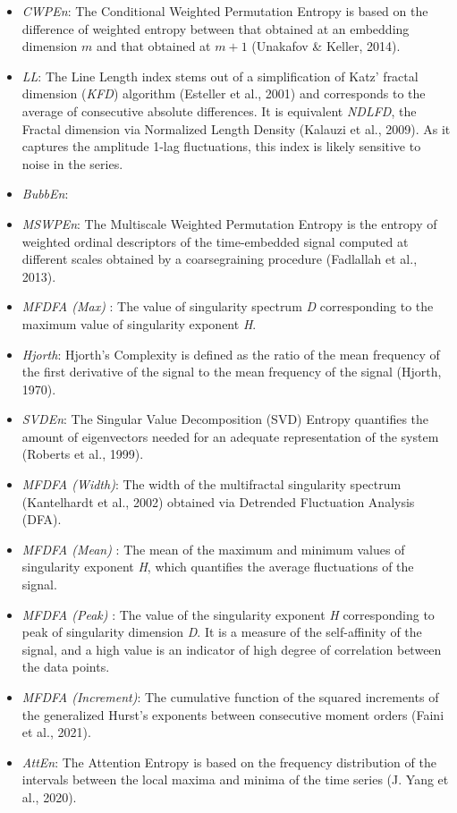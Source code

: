 \documentclass[
  man]{apa6}
\providecommand{\tightlist}{%
  \setlength{\itemsep}{0pt}\setlength{\parskip}{0pt}}
\begin{document}
\begin{itemize}
\tightlist
\item
  \emph{CWPEn}: The Conditional Weighted Permutation Entropy is based on the difference of weighted entropy between that obtained at an embedding dimension \(m\) and that obtained at \(m+1\) (Unakafov \& Keller, 2014).
\item
  \emph{LL}: The Line Length index stems out of a simplification of Katz' fractal dimension (\emph{KFD}) algorithm (Esteller et al., 2001) and corresponds to the average of consecutive absolute differences. It is equivalent \emph{NDLFD}, the Fractal dimension via Normalized Length Density (Kalauzi et al., 2009). As it captures the amplitude 1-lag fluctuations, this index is likely sensitive to noise in the series.
\item
  \emph{BubbEn}:
\item
  \emph{MSWPEn}: The Multiscale Weighted Permutation Entropy is the entropy of weighted ordinal descriptors of the time-embedded signal computed at different scales obtained by a coarsegraining procedure (Fadlallah et al., 2013).
\item
  \emph{MFDFA (Max)} : The value of singularity spectrum \emph{D} corresponding to the maximum value of singularity exponent \emph{H}.
\item
  \emph{Hjorth}: Hjorth's Complexity is defined as the ratio of the mean frequency of the first derivative of the signal to the mean frequency of the signal (Hjorth, 1970).
\item
  \emph{SVDEn}: The Singular Value Decomposition (SVD) Entropy quantifies the amount of eigenvectors needed for an adequate representation of the system (Roberts et al., 1999).
\item
  \emph{MFDFA (Width)}: The width of the multifractal singularity spectrum (Kantelhardt et al., 2002) obtained via Detrended Fluctuation Analysis (DFA).
\item
  \emph{MFDFA (Mean)} : The mean of the maximum and minimum values of singularity exponent \emph{H}, which quantifies the average fluctuations of the signal.
\item
  \emph{MFDFA (Peak)} : The value of the singularity exponent \emph{H} corresponding to peak of singularity dimension \emph{D}. It is a measure of the self-affinity of the signal, and a high value is an indicator of high degree of correlation between the data points.
\item
  \emph{MFDFA (Increment)}: The cumulative function of the squared increments of the generalized Hurst's exponents between consecutive moment orders (Faini et al., 2021).
\item
  \emph{AttEn}: The Attention Entropy is based on the frequency distribution of the intervals between the local maxima and minima of the time series (J. Yang et al., 2020).
\end{itemize}
\end{document}
